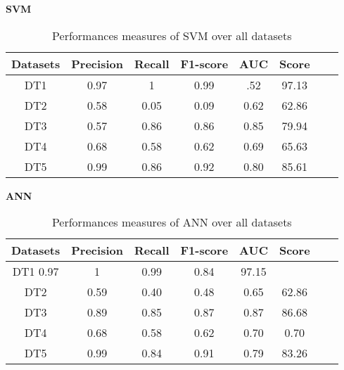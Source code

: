 \documentclass[10pt,a4paper]{article}
\begin{document}
\begin{center}
\textbf{SVM}

\end{center}
\begin{table}[!ht]
\centering
\begin{tabular}{*{6}{c}l r}
  \toprule
  \textbf{Datasets} & \textbf{Precision} & \textbf{Recall} & \textbf{F1-score}&\textbf{AUC} &\textbf{Score}\\
   \midrule
  DT1 &0.97 &1   &0.99 &.52 &97.13 \\
  DT2 &0.58  &0.05   & 0.09&0.62&62.86\\
  DT3 &0.57 & 0.86&0.86&0.85&79.94\\
  DT4 & 0.68&0.58&0.62&0.69&65.63\\
  DT5 &0.99 &0.86&0.92&0.80&85.61\\
    \bottomrule
\end{tabular}
\caption{Performances measures of SVM over all datasets}\label{perf-measure-dt1}
\end{table}
\begin{center}
\textbf{ANN}
\end{center}
\begin{table}[!ht]
\centering
\begin{tabular}{*{6}{c}l r}
  \toprule
  \textbf{Datasets} & \textbf{Precision} & \textbf{Recall} & \textbf{F1-score}&\textbf{AUC} &\textbf{Score}\\
   \midrule
  DT1 0.97&1 &0.99   &0.84 &97.15  \\
  DT2 &0.59  &0.40   &0.48&0.65&62.86 \\
  DT3 &0.89 &0.85 &0.87&0.87&86.68\\
  DT4 &0.68 &0.58&0.62&0.70&0.70\\
  DT5 &0.99 &0.84&0.91&0.79&83.26\\ 
    \bottomrule
\end{tabular}
\caption{Performances measures of ANN over all datasets}\label{perf-measure-dt1}
\end{table}
\end{document}
